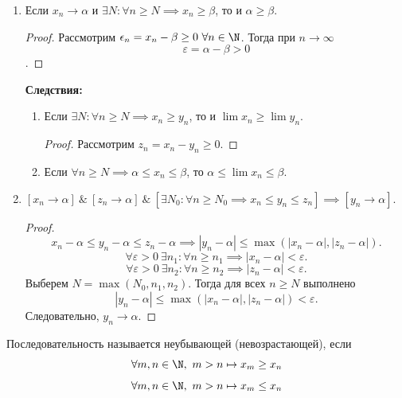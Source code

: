 \begin{enumerate}
    \item Если \(x_n \to \alpha\) и \(\exists N: \forall n \ge N \implies x_n \ge \beta\), то и \(\alpha \ge \beta\).

\begin{proof}
    Рассмотрим \(\epsilon_n = x_n - \beta \geq 0 \ \forall n \in \N\). Тогда при
    \(n\to\infty\)
\[\varepsilon = \alpha - \beta > 0\].
\end{proof}

\noindent\textbf{Следствия:}

\begin{enumerate}

\item Если \(\exists N: \forall n \ge N \implies x_n \ge y_n\), то и
\(
\lim x_n \ge \lim y_n.
\)

\begin{proof}
Рассмотрим \(z_n = x_n - y_n \ge 0\).
\end{proof}

\item Если \(\forall n \ge N \implies \alpha \le x_n \le \beta\), то
\( \alpha \le \lim x_n \le \beta. \)

\end{enumerate}

\item \([x_n \to \alpha] \ \&\ [z_n \to \alpha] \ \&\ [\exists N_0: \forall n \ge N_0 \implies x_n \le y_n \le z_n] \implies [y_n \to \alpha]\).

\begin{proof}
\[
x_n - \alpha \le y_n - \alpha \le z_n - \alpha
\implies
|y_n - \alpha| \le \max(|x_n - \alpha|, |z_n - \alpha|).
\]
\[
\forall \varepsilon > 0 \ \exists n_1: \forall n \ge n_1 \implies |x_n - \alpha| < \varepsilon.
\]
\[
\forall \varepsilon > 0 \ \exists n_2: \forall n \ge n_2 \implies |z_n - \alpha| < \varepsilon.
\]
Выберем \(N = \max(N_0, n_1, n_2)\). Тогда для всех \(n \ge N\) выполнено
\[
|y_n - \alpha| \le \max(|x_n - \alpha|, |z_n - \alpha|) < \varepsilon.
\]
Следовательно, \(y_n \to \alpha\).

\end{proof}

\end{enumerate}


\begin{definition}
Последовательность называется неубывающей (невозрастающей), если
\[
\forall m, n \in \N,\ m > n \mapsto x_m \geq x_n
\]
\[
\forall m, n \in \N,\ m > n \mapsto x_m \leq x_n
\]

\end{definition}

